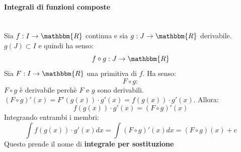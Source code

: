 \documentclass[12pt]{report}
\begin{document}
			\paragraph{Integrali di funzioni composte} \quad \\
			Sia $f: I \to \mathbbm{R}$ continua e sia $g: J \to \mathbbm{R}$ derivabile. \\
			$g(J) \subset I$ e quindi ha senso:
			\[
			f \circ g: J \to \mathbbm{R}
			\]
			Sia $F: I \to \mathbbm{R}$ una primitiva di $f$. Ha senso:
			\[
			F \circ g:
			\]
			$F \circ g$ è derivabile perchè $F$ e $g$ sono derivabili. \\
			$(F \circ g)'(x) = F'(g(x)) \cdot g'(x) = f(g(x)) \cdot g'(x)$.
			Allora:
			\[
			f(g(x))\cdot g'(x) = (F \circ g)'(x)
			\]
			Integrando entrambi i membri:
			\[
			\int f(g(x)) \cdot g'(x)dx = \int (F \circ g)'(x)dx = (F \circ g)(x) + c
			\]
			Questo prende il nome di \textbf{integrale per sostituzione}
\end{document}

